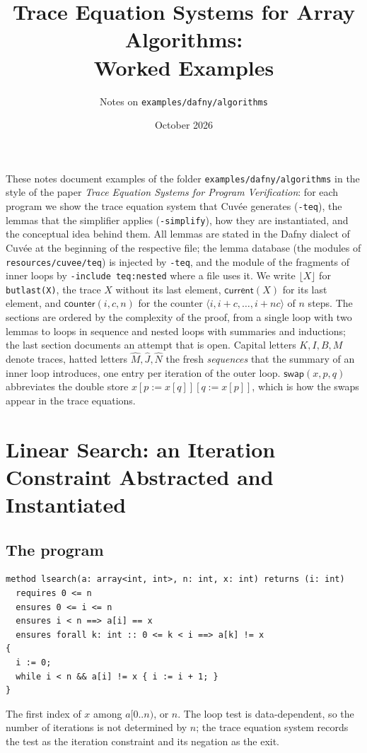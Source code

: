 \documentclass[11pt,a4paper]{article}
\title{Trace Equation Systems for Array Algorithms:\\ Worked Examples}
\author{Notes on \texttt{examples/dafny/algorithms}}
\date{October 2026}
\newcommand{\bl}[1]{\lfloor #1\rfloor}                       %
\newcommand{\cnt}{\mathsf{counter}}
\newcommand{\cur}{\mathsf{current}}
\newcommand{\swap}[3]{\mathsf{swap}(#1, #2, #3)}
\newcommand{\seq}[1]{\hat{#1}}                               %
\begin{document}
\maketitle

\noindent
These notes document examples of the folder \texttt{examples/dafny/algorithms} in the style of the
paper \emph{Trace Equation Systems for Program Verification}: for each program we show the trace
equation system that Cuvée generates (\texttt{-teq}), the lemmas that the simplifier applies
(\texttt{-simplify}), how they are instantiated, and the conceptual idea behind them. All lemmas are
stated in the Dafny dialect of Cuvée at the beginning of the respective file; the lemma database (the
modules of \texttt{resources/cuvee/teq}) is injected by \texttt{-teq}, and the module of the fragments of
inner loops by \texttt{-include teq:nested} where a file uses it. We write $\bl{X}$ for \texttt{butlast(X)}, the trace $X$
without its last element, $\cur(X)$ for its last element, and $\cnt(i, c, n)$ for the counter
$\langle i, i + c, \ldots, i + n c\rangle$ of $n$ steps. The sections are ordered by the complexity of the proof, from a
single loop with two lemmas to loops in sequence and nested loops with summaries and inductions; the last
section documents an attempt that is open. Capital letters $K, I, B, M$ denote traces,
hatted letters $\seq{M}, \seq{J}, \seq{N}$ the fresh \emph{sequences} that the summary of an inner loop
introduces, one entry per iteration of the outer loop. $\swap{x}{p}{q}$ abbreviates the double store
$x[p := x[q]][q := x[p]]$, which is how the swaps appear in the trace equations.

\section{Linear Search: an Iteration Constraint Abstracted and Instantiated}\label{sec:lsearch}

\subsection{The program}
\begin{lstlisting}
method lsearch(a: array<int, int>, n: int, x: int) returns (i: int)
  requires 0 <= n
  ensures 0 <= i <= n
  ensures i < n ==> a[i] == x
  ensures forall k: int :: 0 <= k < i ==> a[k] != x
{
  i := 0;
  while i < n && a[i] != x { i := i + 1; }
}
\end{lstlisting}
The first index of $x$ among $a[0..n)$, or $n$. The loop test is data-dependent, so the number of
iterations is not determined by $n$; the trace equation system records the test as the iteration
constraint and its negation as the exit.
\end{document}
